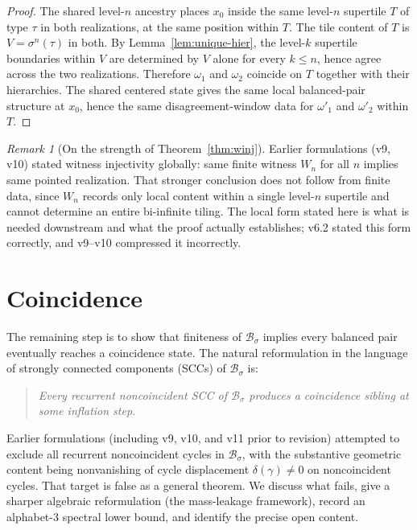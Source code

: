 \documentclass[11pt]{article}
\theoremstyle{plain}
\theoremstyle{definition}
\theoremstyle{remark}
\newtheorem{remark}[theorem]{Remark}
\newcommand{\B}{\mathcal{B}}
\begin{document}
\begin{proof}
The shared level-$n$ ancestry places $x_0$ inside the same level-$n$ supertile $T$ of type $\tau$ in both realizations, at the same position within $T$. The tile content of $T$ is $V=\sigma^n(\tau)$ in both. By Lemma~\ref{lem:unique-hier}, the level-$k$ supertile boundaries within $V$ are determined by $V$ alone for every $k\le n$, hence agree across the two realizations. Therefore $\omega_1$ and $\omega_2$ coincide on $T$ together with their hierarchies. The shared centered state gives the same local balanced-pair structure at $x_0$, hence the same disagreement-window data for $\omega'_1$ and $\omega'_2$ within $T$.
\end{proof}

\begin{remark}[On the strength of Theorem~\ref{thm:winj}]\label{rem:winj-history}
Earlier formulations (v9, v10) stated witness injectivity globally: same finite witness $W_n$ for all $n$ implies same pointed realization. That stronger conclusion does not follow from finite data, since $W_n$ records only local content within a single level-$n$ supertile and cannot determine an entire bi-infinite tiling. The local form stated here is what is needed downstream and what the proof actually establishes; v6.2 stated this form correctly, and v9--v10 compressed it incorrectly.
\end{remark}

\section{Coincidence}\label{sec:coincidence}

The remaining step is to show that finiteness of $\B_\sigma$ implies every balanced pair eventually reaches a coincidence state. The natural reformulation in the language of strongly connected components (SCCs) of $\B_\sigma$ is:

\begin{quote}
\emph{Every recurrent noncoincident SCC of $\B_\sigma$ produces a coincidence sibling at some inflation step.}
\end{quote}

Earlier formulations (including v9, v10, and v11 prior to revision) attempted to exclude all recurrent noncoincident cycles in $\B_\sigma$, with the substantive geometric content being nonvanishing of cycle displacement $\delta(\gamma)\ne 0$ on noncoincident cycles. That target is false as a general theorem. We discuss what fails, give a sharper algebraic reformulation (the mass-leakage framework), record an alphabet-$3$ spectral lower bound, and identify the precise open content.
\end{document}
